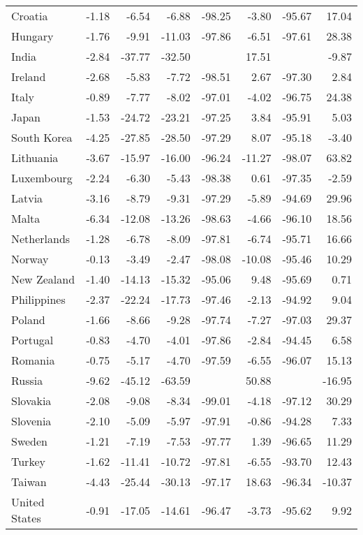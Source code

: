 \begin{longtable}{lrrrrrrr}
  Croatia & -1.18 & -6.54 & -6.88 & -98.25 & -3.80 & -95.67 & 17.04 \\ 
  Hungary & -1.76 & -9.91 & -11.03 & -97.86 & -6.51 & -97.61 & 28.38 \\ 
  India & -2.84 & -37.77 & -32.50 &  & 17.51 &  & -9.87 \\ 
  Ireland & -2.68 & -5.83 & -7.72 & -98.51 & 2.67 & -97.30 & 2.84 \\ 
  Italy & -0.89 & -7.77 & -8.02 & -97.01 & -4.02 & -96.75 & 24.38 \\ 
  Japan & -1.53 & -24.72 & -23.21 & -97.25 & 3.84 & -95.91 & 5.03 \\ 
  South Korea & -4.25 & -27.85 & -28.50 & -97.29 & 8.07 & -95.18 & -3.40 \\ 
  Lithuania & -3.67 & -15.97 & -16.00 & -96.24 & -11.27 & -98.07 & 63.82 \\ 
  Luxembourg & -2.24 & -6.30 & -5.43 & -98.38 & 0.61 & -97.35 & -2.59 \\ 
  Latvia & -3.16 & -8.79 & -9.31 & -97.29 & -5.89 & -94.69 & 29.96 \\ 
  Malta & -6.34 & -12.08 & -13.26 & -98.63 & -4.66 & -96.10 & 18.56 \\ 
  Netherlands & -1.28 & -6.78 & -8.09 & -97.81 & -6.74 & -95.71 & 16.66 \\ 
  Norway & -0.13 & -3.49 & -2.47 & -98.08 & -10.08 & -95.46 & 10.29 \\ 
  New Zealand & -1.40 & -14.13 & -15.32 & -95.06 & 9.48 & -95.69 & 0.71 \\ 
  Philippines & -2.37 & -22.24 & -17.73 & -97.46 & -2.13 & -94.92 & 9.04 \\ 
  Poland & -1.66 & -8.66 & -9.28 & -97.74 & -7.27 & -97.03 & 29.37 \\ 
  Portugal & -0.83 & -4.70 & -4.01 & -97.86 & -2.84 & -94.45 & 6.58 \\ 
  Romania & -0.75 & -5.17 & -4.70 & -97.59 & -6.55 & -96.07 & 15.13 \\ 
  Russia & -9.62 & -45.12 & -63.59 &  & 50.88 &  & -16.95 \\ 
  Slovakia & -2.08 & -9.08 & -8.34 & -99.01 & -4.18 & -97.12 & 30.29 \\ 
  Slovenia & -2.10 & -5.09 & -5.97 & -97.91 & -0.86 & -94.28 & 7.33 \\ 
  Sweden & -1.21 & -7.19 & -7.53 & -97.77 & 1.39 & -96.65 & 11.29 \\ 
  Turkey & -1.62 & -11.41 & -10.72 & -97.81 & -6.55 & -93.70 & 12.43 \\ 
  Taiwan & -4.43 & -25.44 & -30.13 & -97.17 & 18.63 & -96.34 & -10.37 \\ 
  United States & -0.91 & -17.05 & -14.61 & -96.47 & -3.73 & -95.62 & 9.92 \\ 
   \hline
\hline
\end{longtable}
